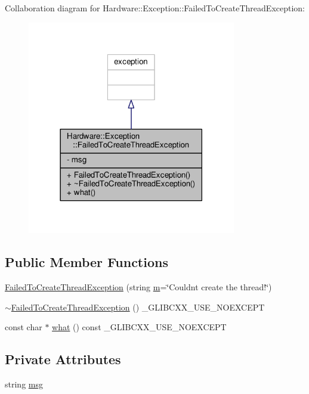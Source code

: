 Collaboration diagram for Hardware\+:\+:Exception\+:\+:Failed\+To\+Create\+Thread\+Exception\+:\nopagebreak
\begin{figure}[H]
\begin{center}
\leavevmode
\includegraphics[width=258pt]{class_hardware_1_1_exception_1_1_failed_to_create_thread_exception__coll__graph}
\end{center}
\end{figure}
\subsection*{Public Member Functions}
\begin{DoxyCompactItemize}
\item 
\hyperlink{class_hardware_1_1_exception_1_1_failed_to_create_thread_exception_acb17213ac3aeb351ca6d96cf8e0801f4}{Failed\+To\+Create\+Thread\+Exception} (string \hyperlink{_gen_blob_8m_ab3cd915d758008bd19d0f2428fbb354a}{m}=\char`\"{}Couldn\textquotesingle{}t create the thread!\char`\"{})
\item 
\hyperlink{class_hardware_1_1_exception_1_1_failed_to_create_thread_exception_a1fdbe3e02a893ffe99a562c821329242}{$\sim$\+Failed\+To\+Create\+Thread\+Exception} () \+\_\+\+G\+L\+I\+B\+C\+X\+X\+\_\+\+U\+S\+E\+\_\+\+N\+O\+E\+X\+C\+E\+P\+T
\item 
const char $\ast$ \hyperlink{class_hardware_1_1_exception_1_1_failed_to_create_thread_exception_a4518723d8cb1f17d3f981d3a29220e28}{what} () const \+\_\+\+G\+L\+I\+B\+C\+X\+X\+\_\+\+U\+S\+E\+\_\+\+N\+O\+E\+X\+C\+E\+P\+T
\end{DoxyCompactItemize}
\subsection*{Private Attributes}
\begin{DoxyCompactItemize}
\item 
string \hyperlink{class_hardware_1_1_exception_1_1_failed_to_create_thread_exception_a095cd7250c0a527623cf993c991572a8}{msg}
\end{DoxyCompactItemize}


